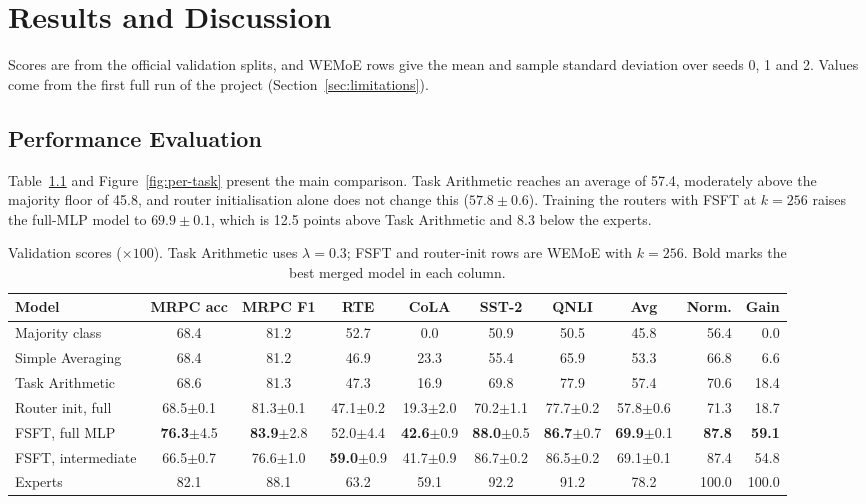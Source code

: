 \chapter{Results and Discussion}

Scores are from the official validation splits, and WEMoE rows give the mean and sample standard deviation over seeds 0, 1 and 2. Values come from the first full run of the project (Section~\ref{sec:limitations}).

\section{Performance Evaluation}

Table~\ref{tab:main} and Figure~\ref{fig:per-task} present the main comparison. Task Arithmetic reaches an average of 57.4, moderately above the majority floor of 45.8, and router initialisation alone does not change this ($57.8\pm0.6$). Training the routers with FSFT at $k=256$ raises the full-MLP model to $69.9\pm0.1$, which is 12.5 points above Task Arithmetic and 8.3 below the experts.

\begin{table}[htbp]
  \centering\tablestyle
  \caption{Validation scores ($\times100$). Task Arithmetic uses $\lambda=0.3$; FSFT and router-init rows are WEMoE with $k=256$. Bold marks the best merged model in each column.}
  \label{tab:main}
  \setlength{\tabcolsep}{3pt}\begin{tabularx}{\linewidth}{X c c c c c c c r r}
    \toprule
    Model & MRPC acc & MRPC F1 & RTE & CoLA & SST-2 & QNLI & Avg & Norm. & Gain\\
    \midrule
    Majority class & 68.4 & 81.2 & 52.7 & 0.0 & 50.9 & 50.5 & 45.8 & 56.4 & 0.0\\
    Simple Averaging & 68.4 & 81.2 & 46.9 & 23.3 & 55.4 & 65.9 & 53.3 & 66.8 & 6.6\\
    Task Arithmetic & 68.6 & 81.3 & 47.3 & 16.9 & 69.8 & 77.9 & 57.4 & 70.6 & 18.4\\
    Router init, full & 68.5$\pm$0.1 & 81.3$\pm$0.1 & 47.1$\pm$0.2 & 19.3$\pm$2.0 & 70.2$\pm$1.1 & 77.7$\pm$0.2 & 57.8$\pm$0.6 & 71.3 & 18.7\\
    FSFT, full MLP & \textbf{76.3}$\pm$4.5 & \textbf{83.9}$\pm$2.8 & 52.0$\pm$4.4 & \textbf{42.6}$\pm$0.9 & \textbf{88.0}$\pm$0.5 & \textbf{86.7}$\pm$0.7 & \textbf{69.9}$\pm$0.1 & \textbf{87.8} & \textbf{59.1}\\
    FSFT, intermediate & 66.5$\pm$0.7 & 76.6$\pm$1.0 & \textbf{59.0}$\pm$0.9 & 41.7$\pm$0.9 & 86.7$\pm$0.2 & 86.5$\pm$0.2 & 69.1$\pm$0.1 & 87.4 & 54.8\\
    \midrule
    Experts & 82.1 & 88.1 & 63.2 & 59.1 & 92.2 & 91.2 & 78.2 & 100.0 & 100.0\\
    \bottomrule
  \end{tabularx}
\end{table}

